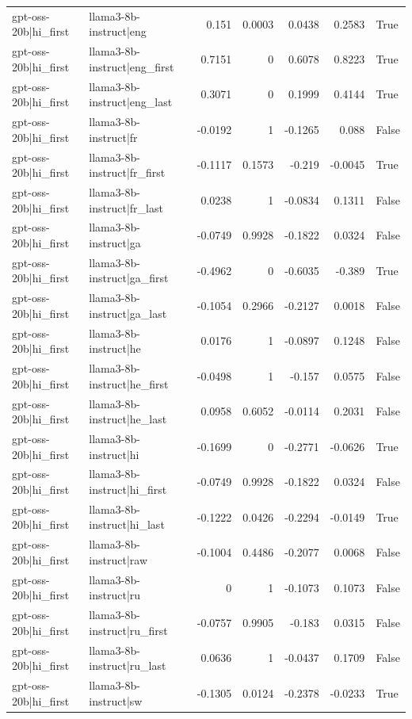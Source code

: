 \begin{table}
\begin{tabular}{l l r r r r l}
gpt-oss-20b|hi_first & llama3-8b-instruct|eng & 0.151 & 0.0003 & 0.0438 & 0.2583 & True \\
gpt-oss-20b|hi_first & llama3-8b-instruct|eng_first & 0.7151 & 0 & 0.6078 & 0.8223 & True \\
gpt-oss-20b|hi_first & llama3-8b-instruct|eng_last & 0.3071 & 0 & 0.1999 & 0.4144 & True \\
gpt-oss-20b|hi_first & llama3-8b-instruct|fr & -0.0192 & 1 & -0.1265 & 0.088 & False \\
gpt-oss-20b|hi_first & llama3-8b-instruct|fr_first & -0.1117 & 0.1573 & -0.219 & -0.0045 & True \\
gpt-oss-20b|hi_first & llama3-8b-instruct|fr_last & 0.0238 & 1 & -0.0834 & 0.1311 & False \\
gpt-oss-20b|hi_first & llama3-8b-instruct|ga & -0.0749 & 0.9928 & -0.1822 & 0.0324 & False \\
gpt-oss-20b|hi_first & llama3-8b-instruct|ga_first & -0.4962 & 0 & -0.6035 & -0.389 & True \\
gpt-oss-20b|hi_first & llama3-8b-instruct|ga_last & -0.1054 & 0.2966 & -0.2127 & 0.0018 & False \\
gpt-oss-20b|hi_first & llama3-8b-instruct|he & 0.0176 & 1 & -0.0897 & 0.1248 & False \\
gpt-oss-20b|hi_first & llama3-8b-instruct|he_first & -0.0498 & 1 & -0.157 & 0.0575 & False \\
gpt-oss-20b|hi_first & llama3-8b-instruct|he_last & 0.0958 & 0.6052 & -0.0114 & 0.2031 & False \\
gpt-oss-20b|hi_first & llama3-8b-instruct|hi & -0.1699 & 0 & -0.2771 & -0.0626 & True \\
gpt-oss-20b|hi_first & llama3-8b-instruct|hi_first & -0.0749 & 0.9928 & -0.1822 & 0.0324 & False \\
gpt-oss-20b|hi_first & llama3-8b-instruct|hi_last & -0.1222 & 0.0426 & -0.2294 & -0.0149 & True \\
gpt-oss-20b|hi_first & llama3-8b-instruct|raw & -0.1004 & 0.4486 & -0.2077 & 0.0068 & False \\
gpt-oss-20b|hi_first & llama3-8b-instruct|ru & 0 & 1 & -0.1073 & 0.1073 & False \\
gpt-oss-20b|hi_first & llama3-8b-instruct|ru_first & -0.0757 & 0.9905 & -0.183 & 0.0315 & False \\
gpt-oss-20b|hi_first & llama3-8b-instruct|ru_last & 0.0636 & 1 & -0.0437 & 0.1709 & False \\
gpt-oss-20b|hi_first & llama3-8b-instruct|sw & -0.1305 & 0.0124 & -0.2378 & -0.0233 & True \\

\end{tabular}
\end{table}
